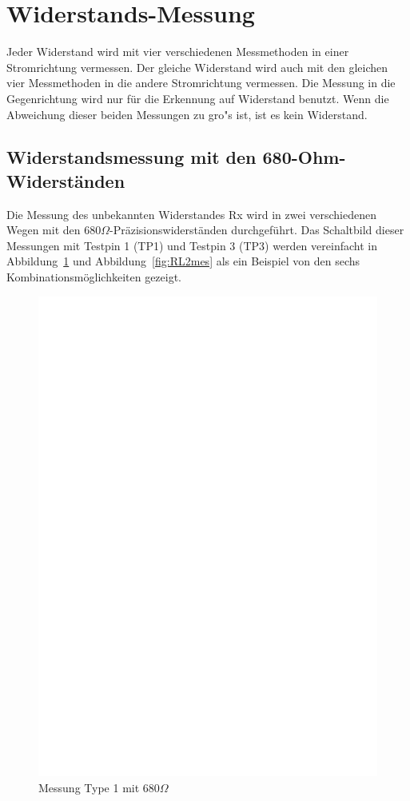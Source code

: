 \section{Widerstands-Messung}
Jeder Widerstand wird mit vier verschiedenen Messmethoden in einer Stromrichtung vermessen.
Der gleiche Widerstand wird auch mit den gleichen vier Messmethoden in die andere Stromrichtung vermessen.
Die Messung in die Gegenrichtung wird nur f\"ur die Erkennung auf Widerstand benutzt.
Wenn die Abweichung dieser beiden Messungen zu gro"s ist, ist es kein Widerstand.

\subsection{Widerstandsmessung mit den 680-Ohm-Widerst\"anden}
Die Messung des unbekannten Widerstandes Rx wird in zwei verschiedenen Wegen mit den \(680\Omega\)-Pr\"azisionswiderst\"anden
 durchgef\"uhrt.
Das Schaltbild dieser Messungen mit Testpin 1 (TP1) und Testpin 3 (TP3) werden vereinfacht in Abbildung~\ref{fig:RL1mes} und Abbildung~\ref{fig:RL2mes} als ein Beispiel von den sechs Kombinationsm\"oglichkeiten gezeigt.

\begin{figure}[H]
\centering
\includegraphics[]{../FIG/ResistormessL1.eps}
\caption{Messung Type 1 mit \(680\Omega\) }
\label{fig:RL1mes}
\end{figure}

